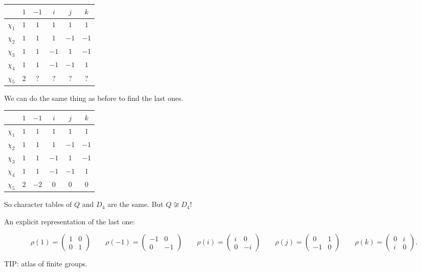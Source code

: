 \begin{center}\begin{tabular}{cccccc}
    & $1$ &  $-1$ &  $i$ &  $j$ &  $k$\\\hline
    $\chi_{1}$ & $1$ & $1$ & $1$& $1$& $1$\\
    $\chi_{2}$ & $1$ & $1$ & $1$& $-1$& $-1$\\
    $\chi_{3}$ & $1$ & $1$ & $-1$& $1$& $-1$\\
    $\chi_{4}$ & $1$ & $1$ & $-1$& $-1$& $1$\\
    $\chi_{5}$ & $2$ & $?$ & $?$& $?$& $?$\\
\end{tabular}\end{center}

We can do the same thing as before to find the last ones.

\begin{center}\begin{tabular}{cccccc}
    & $1$ &  $-1$ &  $i$ &  $j$ &  $k$\\\hline
    $\chi_{1}$ & $1$ & $1$ & $1$& $1$& $1$\\
    $\chi_{2}$ & $1$ & $1$ & $1$& $-1$& $-1$\\
    $\chi_{3}$ & $1$ & $1$ & $-1$& $1$& $-1$\\
    $\chi_{4}$ & $1$ & $1$ & $-1$& $-1$& $1$\\
    $\chi_{5}$ & $2$ & $-2$ & $0$& $0$& $0$\\
\end{tabular}\end{center}

So character tables of $Q$ and  $ D_4$ are the same. But $Q \not \cong D_4$!

An explicit representation of the last one:

\[
    \rho(1) = \begin{pmatrix}
        1 & 0 \\
        0 & 1
    \end{pmatrix} \qquad
    \rho(-1) = \begin{pmatrix}
        -1 & 0 \\
        0 & -1
    \end{pmatrix} \qquad
    \rho(i) = \begin{pmatrix}
        i & 0 \\
        0 & -i
    \end{pmatrix} \qquad
    \rho(j) = \begin{pmatrix}
        0 & 1 \\
        -1 & 0
    \end{pmatrix} \qquad
    \rho(k) = \begin{pmatrix}
        0 & i \\
        i & 0
    \end{pmatrix}
.\] 

TIP: atlas of finite groups.
